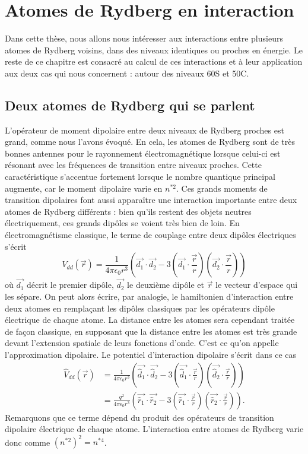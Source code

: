 \section{Atomes de Rydberg en interaction}
Dans cette thèse, nous allons nous intéresser aux interactions entre plusieurs atomes de Rydberg voisins, dans des niveaux identiques ou proches en énergie.
Le reste de ce chapitre est consacré au calcul de ces interactions et à leur application aux deux cas qui nous concernent : autour des niveaux 60S et 50C.

	\subsection{Deux atomes de Rydberg qui se parlent}
L'opérateur de moment dipolaire entre deux niveaux de Rydberg proches est grand, comme nous l'avons évoqué.
En cela, les atomes de Rydberg sont de très bonnes antennes pour le rayonnement électromagnétique lorsque celui-ci est résonant avec les fréquences de transition entre niveaux proches.
Cette caractéristique s'accentue fortement lorsque le nombre quantique principal augmente, car le moment dipolaire varie en $n^{*2}$.
Ces grands moments de transition dipolaires font aussi apparaître une interaction importante entre deux atomes de Rydberg différents : bien qu'ils restent des objets neutres électriquement, ces grands dipôles se voient très bien de loin.
En électromagnétisme classique, le terme de couplage entre deux dipôles électriques s'écrit \cite{TXT_JACKSON}
\begin{equation}\label{eq:classicDipole}
V_{dd}(\vec{r}) = \frac{1}{4\pi\epsilon_0 r^3} \left( \vec{d_1}\cdot \vec{d_2} - 3(\vec{d_1}\cdot \frac{\vec{r}}{r})(\vec{d_2}\cdot\frac{\vec{r}}{r}) \right)
\end{equation}
où $\vec{d_1}$ décrit le premier dipôle, $\vec{d_2}$ le deuxième dipôle et $\vec{r}$ le vecteur d'espace qui les sépare.
On peut alors écrire, par analogie, le hamiltonien d'interaction entre deux atomes en remplaçant les dipôles classiques par les opérateurs dipôle électrique de chaque atome.
La distance entre les atomes sera cependant traitée de façon classique, en supposant que la distance entre les atomes est très grande devant l'extension spatiale de leurs fonctions d'onde. C'est ce qu'on appelle l'approximation dipolaire.
Le potentiel d'interaction dipolaire s'écrit dans ce cas
\begin{equation}\label{eq:quantDipole}
\begin{aligned}
\hat{V}_{dd}(\vec{r}) &= \frac{1}{4\pi\epsilon_0 r^3} \left( \vec{\hat{d}_1}\cdot \vec{\hat{d}_2} - 3(\vec{\hat{d}_1}\cdot \frac{\vec{r}}{r})(\vec{\hat{d}_2}\cdot\frac{\vec{r}}{r}) \right) \\
&= \frac{q^2}{4\pi\epsilon_0 r^3} \left( \vec{\hat{r}_1}\cdot \vec{\hat{r}_2} - 3(\vec{\hat{r}_1}\cdot \frac{\vec{r}}{r})(\vec{\hat{r}_2}\cdot\frac{\vec{r}}{r}) \right).
\end{aligned}
\end{equation}
%
Remarquons que ce terme dépend du produit des opérateurs de transition dipolaire électrique de chaque atome. L'interaction entre atomes de Rydberg varie donc comme $(n^{*2})^2 = n^{*4}$.

